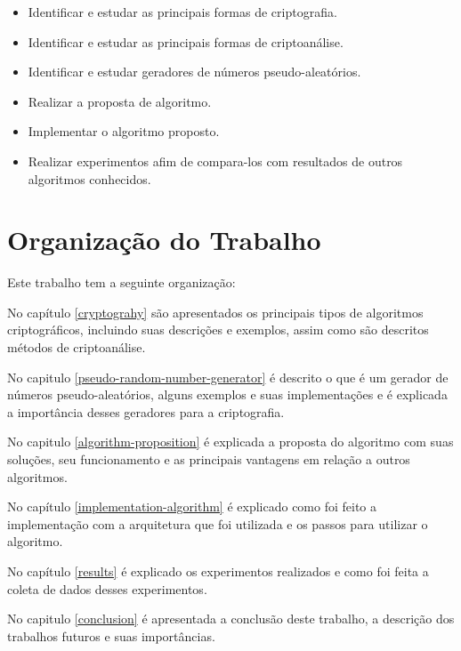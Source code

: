 \begin{itemize}
	\item Identificar e estudar as principais formas de criptografia.
	\item Identificar e estudar as principais formas de criptoanálise.
	\item Identificar e estudar geradores de números pseudo-aleatórios.
	\item Realizar a proposta de algoritmo.
	\item Implementar o algoritmo proposto.
	\item Realizar experimentos afim de compara-los com resultados de outros algoritmos conhecidos.
\end{itemize}

\section{Organização do Trabalho}
\label{paper-organization}

Este trabalho tem a seguinte organização:

No capítulo \ref{cryptograhy} são apresentados os principais tipos de algoritmos criptográficos, incluindo suas descrições e exemplos, assim como são descritos métodos de criptoanálise.

No capitulo \ref{pseudo-random-number-generator} é descrito o que é um gerador de números pseudo-aleatórios, alguns exemplos e suas implementações e é explicada a importância desses geradores para a criptografia. 

No capitulo \ref{algorithm-proposition} é explicada a proposta do algoritmo com suas soluções, seu funcionamento e as principais vantagens em relação a outros algoritmos.

No capítulo \ref{implementation-algorithm} é explicado como foi feito a implementação com a arquitetura que foi utilizada e os passos para utilizar o algoritmo.

No capítulo \ref{results} é explicado os experimentos realizados e como foi feita a coleta de dados desses experimentos. 

No capitulo \ref{conclusion} é apresentada a conclusão deste trabalho, a descrição dos trabalhos futuros e suas importâncias.